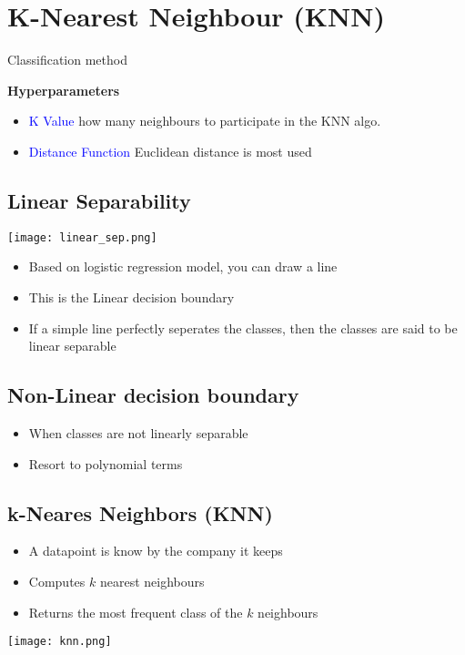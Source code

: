\section{K-Nearest Neighbour (KNN)}
Classification method

\textbf{Hyperparameters}
\begin{itemize}
    \item \textcolor{blue}{K Value} how many neighbours to participate in the KNN algo.
    \item \textcolor{blue}{Distance Function} Euclidean distance is most used
\end{itemize}

\subsection{Linear Separability}
\texttt{[image: linear\_sep.png]}

\begin{itemize}
    \item Based on logistic regression model, you can draw a line
    \item This is the Linear decision boundary
    \item If a simple line perfectly seperates the classes, then the classes are said to be linear separable
\end{itemize}

\subsection{Non-Linear decision boundary}
\begin{itemize}
    \item When classes are not linearly separable
    \item Resort to polynomial terms
\end{itemize}

\subsection{k-Neares Neighbors (KNN)}
\begin{itemize}
    \item A datapoint is know by the company it keeps
    \item Computes $k$ nearest neighbours
    \item Returns the most frequent class of the $k$ neighbours
\end{itemize}
\texttt{[image: knn.png]} \\

